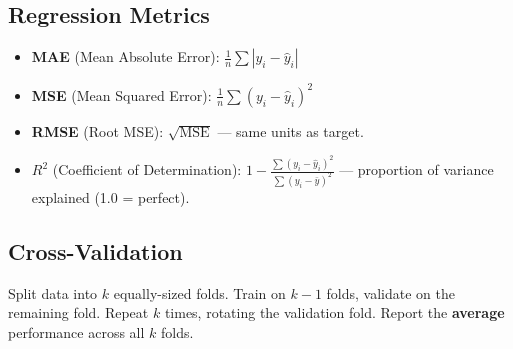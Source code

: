 \documentclass[11pt,a4paper]{article}
\begin{document}
\subsection{Regression Metrics}
\begin{itemize}[leftmargin=*]
  \item \textbf{MAE} (Mean Absolute Error): $\frac{1}{n}\sum|y_i - \hat{y}_i|$
  \item \textbf{MSE} (Mean Squared Error): $\frac{1}{n}\sum(y_i - \hat{y}_i)^2$
  \item \textbf{RMSE} (Root MSE): $\sqrt{\text{MSE}}$ --- same units as target.
  \item \textbf{$R^2$} (Coefficient of Determination): $1 - \frac{\sum(y_i - \hat{y}_i)^2}{\sum(y_i - \bar{y})^2}$ --- proportion of variance explained (1.0 = perfect).
\end{itemize}

\subsection{Cross-Validation}

\begin{definitionbox}
Split data into $k$ equally-sized folds. Train on $k-1$ folds, validate on the remaining fold. Repeat $k$ times, rotating the validation fold. Report the \textbf{average} performance across all $k$ folds.
\end{definitionbox}

\begin{center}
\end{center}
\end{document}
